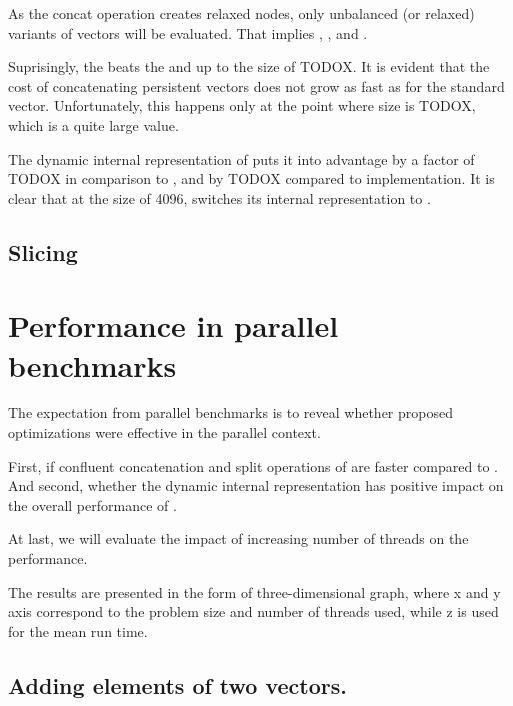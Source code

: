 As the concat operation creates relaxed nodes, only unbalanced (or relaxed) variants of vectors will be evaluated. That implies \stdvec{}, \imrsvec{}, \rrbvec{} and \pvec{}. 

Suprisingly, the \stdvec{} beats the \rrbvec{} and \imrsvec up to the size of TODOX. It is evident that the cost of concatenating persistent vectors does not grow as fast as for the standard vector. Unfortunately, this happens only at the point where size is TODOX, which is a quite large value. 

The dynamic internal representation of \pvec{} puts it into advantage by a factor of TODOX in comparison to \rrbvec{}, and by TODOX compared to \imrsvec{} implementation. It is clear that at the size of 4096, \pvec{} switches its internal representation to \rrbvec{}. 


\subsection{Slicing}

\section{Performance in parallel benchmarks}
The expectation from parallel benchmarks is to reveal whether proposed optimizations were effective in the parallel context. 

First, if confluent concatenation and split operations of \rrbvec{} are faster compared to \rbvec{}. And second, whether the dynamic internal representation has positive impact on the overall performance of \pvec{}. 

At last, we will evaluate the impact of increasing number of threads on the performance. 

The results are presented in the form of three-dimensional graph, where x and y axis correspond to the problem size and number of threads used, while z is used for the mean run time. 

\subsection{Adding elements of two vectors.} 

